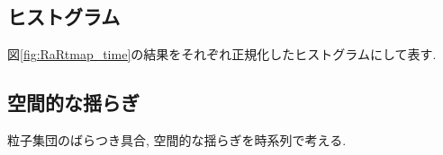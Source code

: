 

% 


% 



% 



\subsection{ヒストグラム}


図\ref{fig:RaRtmap_time}の結果をそれぞれ正規化したヒストグラムにして表す.



\subsection{空間的な揺らぎ}

粒子集団のばらつき具合, 空間的な揺らぎを時系列で考える.

